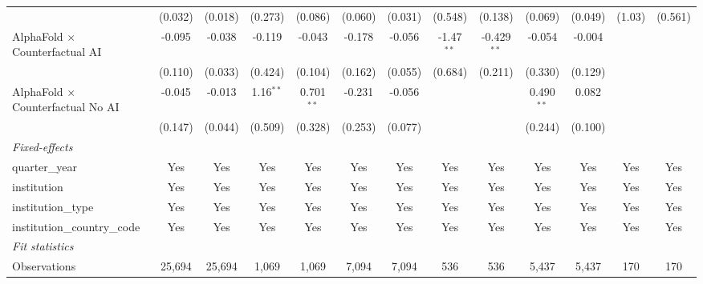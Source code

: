 \begin{tabular}{lcccccccccccc}
                                            & (0.032)       & (0.018)       & (0.273)     & (0.086)      & (0.060)       & (0.031)       & (0.548)      & (0.138)       & (0.069)      & (0.049)      & (1.03)        & (0.561)\\   
   AlphaFold $\times$ Counterfactual AI     & -0.095        & -0.038        & -0.119      & -0.043       & -0.178        & -0.056        & -1.47$^{**}$ & -0.429$^{**}$ & -0.054       & -0.004       &               &   \\   
                                            & (0.110)       & (0.033)       & (0.424)     & (0.104)      & (0.162)       & (0.055)       & (0.684)      & (0.211)       & (0.330)      & (0.129)      &               &   \\   
   AlphaFold $\times$ Counterfactual No AI  & -0.045        & -0.013        & 1.16$^{**}$ & 0.701$^{**}$ & -0.231        & -0.056        &              &               & 0.490$^{**}$ & 0.082        &               &   \\   
                                            & (0.147)       & (0.044)       & (0.509)     & (0.328)      & (0.253)       & (0.077)       &              &               & (0.244)      & (0.100)      &               &   \\   
   \midrule
   \emph{Fixed-effects}\\
   quarter\_year                            & Yes           & Yes           & Yes         & Yes          & Yes           & Yes           & Yes          & Yes           & Yes          & Yes          & Yes           & Yes\\  
   institution                              & Yes           & Yes           & Yes         & Yes          & Yes           & Yes           & Yes          & Yes           & Yes          & Yes          & Yes           & Yes\\  
   institution\_type                        & Yes           & Yes           & Yes         & Yes          & Yes           & Yes           & Yes          & Yes           & Yes          & Yes          & Yes           & Yes\\  
   institution\_country\_code               & Yes           & Yes           & Yes         & Yes          & Yes           & Yes           & Yes          & Yes           & Yes          & Yes          & Yes           & Yes\\  
   \midrule
   \emph{Fit statistics}\\
   Observations                             & 25,694        & 25,694        & 1,069       & 1,069        & 7,094         & 7,094         & 536          & 536           & 5,437        & 5,437        & 170           & 170\\  

\end{tabular}
